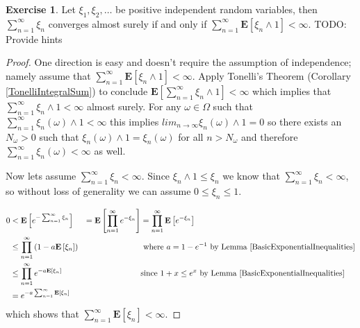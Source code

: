 \documentclass{amsbook}
\theoremstyle{definition}
\newtheorem{xca}{Exercise}
\theoremstyle{remark}
\newcommand{\expectation}[1]{\textbf{E}\left[#1\right]}
\begin{document}
\begin{xca}Let $\xi_1, \xi_2, \dots$ be positive independent random
  variables, then $\sum_{n=1}^\infty \xi_n$ converges almost surely if
  and only if $\sum_{n=1}^\infty \expectation{\xi_n \wedge 1} <
  \infty$.
TODO: Provide hints
\end{xca}
\begin{proof}One direction is easy and doesn't require the assumption
  of independence; namely assume that $\sum_{n=1}^\infty
  \expectation{\xi_n \wedge 1} < \infty$.
Apply Tonelli's Theorem (Corollary \ref{TonelliIntegralSum}) to
conclude $\expectation{\sum_{n=1}^\infty \xi_n \wedge 1} < \infty $
which implies that $\sum_{n=1}^\infty \xi_n \wedge 1 < \infty$ almost
surely.  For any $\omega \in \Omega$ such that $\sum_{n=1}^\infty
\xi_n(\omega) \wedge 1 < \infty$ this implies $lim_{n \to \infty}
\xi_n(\omega) \wedge 1 = 0$ so there exists an $N_\omega > 0$ such
that $\xi_n(\omega) \wedge 1 = \xi_n(\omega)$  for all $n>N_\omega$ 
and therefore $\sum_{n=1}^\infty\xi_n(\omega) < \infty$ as
well.

Now lets assume $\sum_{n=1}^\infty \xi_n < \infty$.  Since $\xi_n
\wedge 1 \leq \xi_n$ we know that $\sum_{n=1}^\infty \xi_n < \infty$, 
so without loss of generality we
can assume $0 \leq \xi_n \leq 1$.

\begin{align*}
0 &< \expectation{e^{-\sum_{n=1}^\infty \xi_n}} 
&=\expectation{\prod_{n=1}^\infty e^{-\xi_n}} 
&= \prod_{n=1}^\infty \expectation{ e^{-\xi_n}} \\
&\leq \prod_{n=1}^\infty \left ( 1 - a\expectation{\xi_n} \right ) &
&\text{ where $a=1-e^{-1}$ by Lemma
  \ref{BasicExponentialInequalities}} \\
&\leq \prod_{n=1}^\infty e^{- a\expectation{\xi_n} } & & \text{since
  $1+x\leq e^x$ by Lemma \ref{BasicExponentialInequalities}} \\
&= e^{-a \sum_{n=1}^\infty \expectation{\xi_n} }
\end{align*}
which shows that $\sum_{n=1}^\infty \expectation{\xi_n} < \infty$.
\end{proof}
\end{document}
